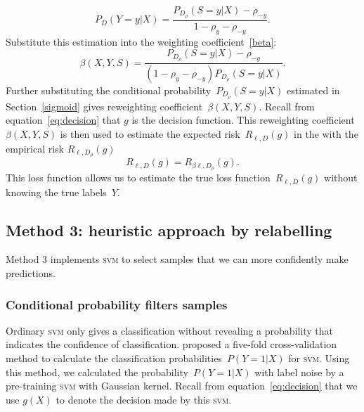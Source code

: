 \documentclass[12pt]{article} %
\newcommand{\svm}{\textsc{svm}}
\newcommand{\loss}{\ell}
\begin{document}
\begin{equation}
    P_D(Y=y|X)=\frac{P_{D_\rho}(S=y|X)-\rho_{-y}}{1-\rho_{y}-\rho_{-y}}.
\end{equation}
Substitute this estimation into the weighting coefficient~\eqref{beta}:
\begin{equation} \label{eq:weighting}
    \beta(X,Y,S)=\frac{P_{D_\rho}(S=y|X)-\rho_{-y}}{(1-\rho_{y}-\rho_{-y})P_{D_\rho}(S=y|X)}.
\end{equation}
Further substituting the conditional probability~$P_{D_\rho}(S=y|X)$ estimated in Section~\ref{sigmoid} gives reweighting coefficient~$\beta(X,Y,S)$.
Recall from equation~\eqref{eq:decision} that  $g$ is the decision function.
This reweighting coefficient~$\beta(X,Y,S)$ is then used to estimate the expected risk~$R_{\loss,D}(g)$ in the with the empirical risk $R_{\loss,D_\rho}(g)$
\begin{equation}
R_{\loss,D}(g) = R_{\beta \loss,D_\rho}(g). \label{eq:loss}
\end{equation}
This loss function allows us to estimate the true loss function~$R_{\loss,D}(g)$ without knowing the true labels~$Y$.

\subsection{Method 3: heuristic approach by relabelling}\label{2nd}
Method 3 implements \textsc{svm} to select samples that we can more confidently make predictions.

\subsubsection{Conditional probability filters samples}\label{2nd2}
Ordinary \textsc{svm} only gives a classification without revealing a probability that indicates the confidence of classification.
\citet{Wu03probabilityestimates} proposed a five-fold cross-validation method to calculate the classification probabilities~$P(Y=1|X)$ for \textsc{svm}.
Using this method, we calculated the probability~$P(Y=1|X)$ with label noise by a pre-training \textsc{svm} with Gaussian kernel. Recall from equation~\eqref{eq:decision} that we use $g(X)$ to denote the decision made by this \svm .
\end{document}

